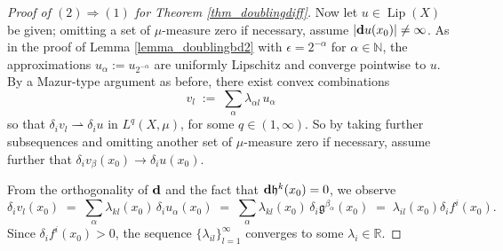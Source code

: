 \documentclass[reqno]{amsart}
\theoremstyle{plain}
\theoremstyle{definition}
\theoremstyle{remark}
\numberwithin{equation}{section}
\renewcommand{\a}{\alpha}
\renewcommand{\b}{\beta}
\renewcommand{\d}{\delta}
\newcommand{\e}{\epsilon}
\newcommand{\g}{\mathfrak{g}}
\newcommand{\h}{\mathfrak{h}}
\newcommand{\Lip}{\operatorname{Lip}}
\newcommand{\N}{\mathbb{N}}
\newcommand{\R}{\mathbb{R}}
\begin{document}
\begin{proof}[Proof of $(2) \Rightarrow (1)$ for Theorem \ref{thm_doublingdiff}]
Now let $u \in \Lip(X)$ be given; omitting a set of $\mu$-measure zero if necessary, assume $|{\bf d}u(x_0)| \neq \infty$.  As in the proof of Lemma \ref{lemma_doublingbd2} with $\e = 2^{-\a}$ for $\a \in \N$, the approximations $u_\a := u_{2^{-\a}}$ are uniformly Lipschitz and converge pointwise to $u$.  By a Mazur-type argument as before, there exist convex combinations 
$$
v_l \;:=\;
\sum_\a \lambda_{\a l} \, u_\a
$$
so that $\d_iv_l \rightharpoonup \d_iu$ in $L^q(X,\mu)$, for some $q \in (1,\infty)$.  
So by taking further subsequences and omitting another set of $\mu$-measure zero if necessary, assume further that $\d_iv_\b(x_0) \to \d_iu(x_0)$.

From the orthogonality of ${\bf d}$ and the fact that ${\bf d}\h^k(x_0) = 0$, we observe
$$
\d_iv_l(x_0) \;=\;
\sum_\a \lambda_{kl}(x_0) \, \d_iu_\a(x_0) \;=\;
\sum_\a \lambda_{kl}(x_0) \, \d_i\g^{\b_\a}(x_0) \;=\;
\lambda_{il}(x_0) \d_if^i(x_0).
$$
Since $\d_if^i(x_0) > 0$, the sequence $\{\lambda_{il}\}_{l=1}^\infty$ converges to some $\lambda_i \in \R$.


\end{proof}
\end{document}
